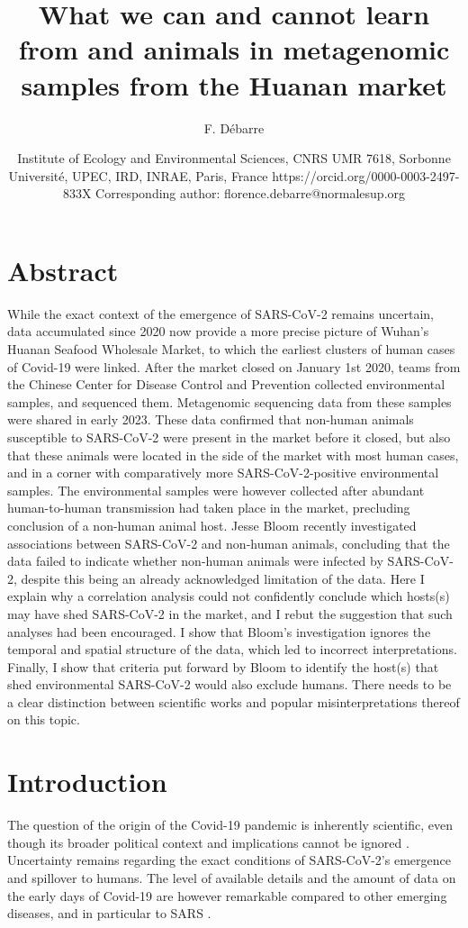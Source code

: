 \documentclass[11pt]{article}
\title{What we can and cannot learn from \sct{} and animals in metagenomic samples from the Huanan market}
\author{F. D\'ebarre}
\date{Institute of Ecology and Environmental Sciences, CNRS UMR 7618, Sorbonne Université, UPEC, IRD, INRAE, Paris, France \newline https://orcid.org/0000-0003-2497-833X \newline Corresponding author: florence.debarre@normalesup.org}
\def \sct {\mbox{SARS-CoV-2}}
\begin{document}
\maketitle

\linenumbers


\section*{Abstract}
While the exact context of the emergence of \sct{} remains uncertain, data accumulated since 2020 now provide a more precise picture of Wuhan’s Huanan Seafood Wholesale Market, to which the earliest clusters of human cases of Covid-19 were linked. After the market closed on January 1st 2020, teams from the Chinese Center for Disease Control and Prevention collected environmental samples, and sequenced them. Metagenomic sequencing data from these samples were shared in early 2023. These data confirmed that non-human animals susceptible to \sct{} were present in the market before it closed, but also that these animals were located in the side of the market with most human cases, and in a corner with comparatively more \sct{}-positive environmental samples. The environmental samples were however collected after abundant human-to-human transmission had taken place in the market, precluding conclusion of a non-human animal host. Jesse Bloom recently investigated associations between \sct{} and non-human animals, concluding that the data failed to indicate whether non-human animals were infected by \sct{}, despite this being an already acknowledged limitation of the data. Here I explain why a correlation analysis could not confidently conclude which hosts(s) may have shed \sct{} in the market, and I rebut the suggestion that such analyses had been encouraged. I show that Bloom’s investigation ignores the temporal and spatial structure of the data, which led to incorrect interpretations. Finally, I show that criteria put forward by Bloom to identify the host(s) that shed environmental \sct{} would also exclude humans. There needs to be a clear distinction between scientific works and popular misinterpretations thereof on this topic. 

\section{Introduction}

The question of the origin of the Covid-19 pandemic is inherently scientific, even though its broader political context and implications cannot be ignored \citep{GostinGronvall2023NEJM}. Uncertainty remains regarding the exact conditions of \sct{}'s emergence and spillover to humans. The level of available details and the amount of data on the early days of Covid-19 are however remarkable compared to other emerging diseases, and in particular to SARS \citep{Xu2004EID, Keusch2022PNAS}.
\end{document}
